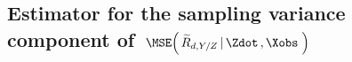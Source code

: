 

\vskip 0.5cm
\subsection{Estimator for the sampling variance component of
\,$\MSE\!\left(\,\widetilde{R}_{d,Y/Z}\left\vert\,\Zdot\,,\Xobs\,\right.\right)$}
\setcounter{theorem}{0}


